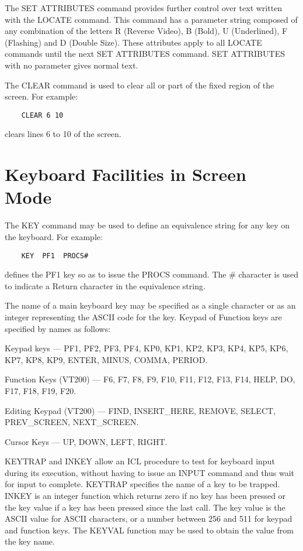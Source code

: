 \documentclass[twoside,11pt]{report}
\newcommand{\xlabel}[1]{}
\begin{document}
The SET ATTRIBUTES command provides further control over text written with
the LOCATE command. This command has a parameter string composed of any
combination of the letters R (Reverse Video), B (Bold), U (Underlined),
F (Flashing) and D (Double Size). These attributes apply to all LOCATE commands
until the next SET ATTRIBUTES command. SET ATTRIBUTES with no parameter
gives normal text.

The CLEAR command is used to clear all or part of the fixed region of the
screen. For example:
\begin{verbatim}
    CLEAR 6 10
\end{verbatim}
clears lines 6 to 10 of the screen.

\section{\xlabel{keyboard_facilities_in_screen_mode}Keyboard Facilities in Screen Mode} 

The KEY command may be used to define an equivalence string for any key
on the keyboard. For example:
\begin{verbatim}
    KEY  PF1  PROCS#
\end{verbatim}
defines the PF1 key so as to issue the PROCS command. The \# character is
used to indicate a Return character in the equivalence string.

The name of a main keyboard key may be specified as a single character or
as an integer representing the ASCII code for the key. Keypad of Function
keys are specified by names as follows:

Keypad keys --- PF1, PF2, PF3, PF4, KP0, KP1, KP2, KP3, KP4, KP5, KP6, KP7,
KP8, KP9, ENTER, MINUS, COMMA, PERIOD.

Function Keys (VT200) --- F6, F7, F8, F9, F10, F11, F12, F13, F14, HELP,
DO, F17, F18, F19, F20.

Editing Keypad (VT200) --- FIND, INSERT\_HERE, REMOVE, SELECT, PREV\_SCREEN,
NEXT\_SCREEN.

Cursor Keys --- UP, DOWN, LEFT, RIGHT.

KEYTRAP and INKEY allow an ICL procedure to test for keyboard input during
its execution, without having to issue an INPUT command and thus wait for
input to complete. KEYTRAP specifies the name of a key to be trapped. INKEY
is an integer function which returns zero if no key has been pressed or
the key value if a key has been pressed since the last call. The key value
is the ASCII value for ASCII characters, or a number between 256 and 511
for keypad and function keys. The KEYVAL function may be used to obtain
the value from the key name.
\end{document}
